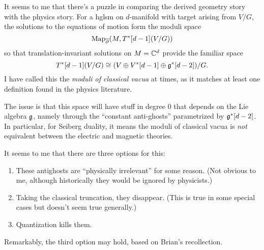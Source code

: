\documentclass[11pt]{amsart}
\begin{document}
It seems to me that there's a puzzle in comparing the derived geometry story with the physics story.
For a hglsm on $d$-manifold with target arising from $V/G$, the solutions to the equations of motion form the moduli space
\[
{\rm Map}_{\overline{\partial}}(M, T^*[d-1](V/G))
\]
so that translation-invariant solutions on $M = \mathbb C^d$ provide the familiar space
\[
T^*[d-1](V/G) \cong (V \oplus V^*[d-1] \oplus \mathfrak g^*[d-2])/G.
\]
I have called this the {\em moduli of classical vacua} at times,
as it matches at least one definition found in the physics literature.

The issue is that this space will have stuff in degree 0 that depends on the Lie algebra $\mathfrak g$, 
namely through the ``constant anti-ghosts'' parametrized by $\mathfrak g^*[d-2]$.
In particular, for Seiberg duality,
it means the moduli of classical vacua is {\em not} equivalent between the electric and magnetic theories.

It seems to me that there are three options for this:
\begin{enumerate}
\item These antighosts are ``physically irrelevant'' for some reason. (Not obvious to me, although historically they would be ignored by physicists.)
\item Taking the classical truncation, they disappear. (This is true in some special cases but doesn't seem true generally.)
\item Quantization kills them. 
\end{enumerate}
Remarkably, the third option may hold, based on Brian's recollection. 
\end{document}
